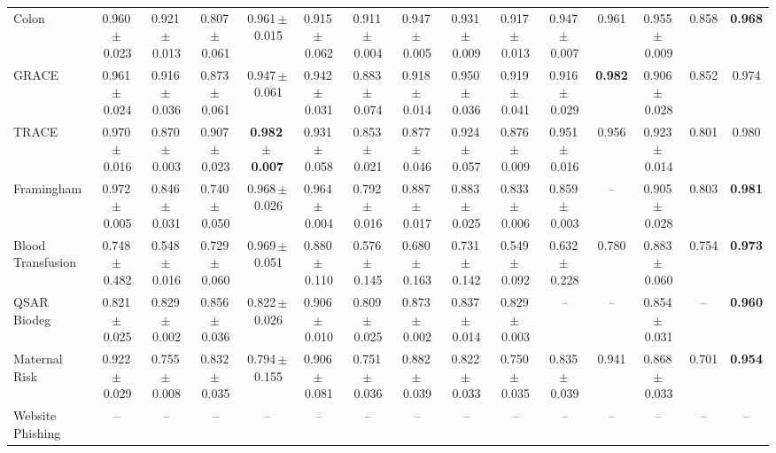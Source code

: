 \documentclass[8pt]{extarticle}
\begin{document}
\begin{longtable}{l*{14}{c}}
Colon & 0.960\,$\pm$\,0.023 & 0.921\,$\pm$\,0.013 & 0.807\,$\pm$\,0.061 & 0.961\,$\pm$\,0.015 & 0.915\,$\pm$\,0.062 & 0.911\,$\pm$\,0.004 & 0.947\,$\pm$\,0.005 & 0.931\,$\pm$\,0.009 & 0.917\,$\pm$\,0.013 & 0.947\,$\pm$\,0.007 & 0.961 & 0.955\,$\pm$\,0.009 & 0.858 & \textbf{0.968} \\
GRACE & 0.961\,$\pm$\,0.024 & 0.916\,$\pm$\,0.036 & 0.873\,$\pm$\,0.061 & 0.947\,$\pm$\,0.061 & 0.942\,$\pm$\,0.031 & 0.883\,$\pm$\,0.074 & 0.918\,$\pm$\,0.014 & 0.950\,$\pm$\,0.036 & 0.919\,$\pm$\,0.041 & 0.916\,$\pm$\,0.029 & \textbf{0.982} & 0.906\,$\pm$\,0.028 & 0.852 & 0.974 \\
TRACE & 0.970\,$\pm$\,0.016 & 0.870\,$\pm$\,0.003 & 0.907\,$\pm$\,0.023 & \textbf{0.982\,$\pm$\,0.007} & 0.931\,$\pm$\,0.058 & 0.853\,$\pm$\,0.021 & 0.877\,$\pm$\,0.046 & 0.924\,$\pm$\,0.057 & 0.876\,$\pm$\,0.009 & 0.951\,$\pm$\,0.016 & 0.956 & 0.923\,$\pm$\,0.014 & 0.801 & 0.980 \\
Framingham & 0.972\,$\pm$\,0.005 & 0.846\,$\pm$\,0.031 & 0.740\,$\pm$\,0.050 & 0.968\,$\pm$\,0.026 & 0.964\,$\pm$\,0.004 & 0.792\,$\pm$\,0.016 & 0.887\,$\pm$\,0.017 & 0.883\,$\pm$\,0.025 & 0.833\,$\pm$\,0.006 & 0.859\,$\pm$\,0.003 & -- & 0.905\,$\pm$\,0.028 & 0.803 & \textbf{0.981} \\
Blood Transfusion & 0.748\,$\pm$\,0.482 & 0.548\,$\pm$\,0.016 & 0.729\,$\pm$\,0.060 & 0.969\,$\pm$\,0.051 & 0.880\,$\pm$\,0.110 & 0.576\,$\pm$\,0.145 & 0.680\,$\pm$\,0.163 & 0.731\,$\pm$\,0.142 & 0.549\,$\pm$\,0.092 & 0.632\,$\pm$\,0.228 & 0.780 & 0.883\,$\pm$\,0.060 & 0.754 & \textbf{0.973} \\
QSAR Biodeg & 0.821\,$\pm$\,0.025 & 0.829\,$\pm$\,0.002 & 0.856\,$\pm$\,0.036 & 0.822\,$\pm$\,0.026 & 0.906\,$\pm$\,0.010 & 0.809\,$\pm$\,0.025 & 0.873\,$\pm$\,0.002 & 0.837\,$\pm$\,0.014 & 0.829\,$\pm$\,0.003 & -- & -- & 0.854\,$\pm$\,0.031 & -- & \textbf{0.960} \\
Maternal Risk & 0.922\,$\pm$\,0.029 & 0.755\,$\pm$\,0.008 & 0.832\,$\pm$\,0.035 & 0.794\,$\pm$\,0.155 & 0.906\,$\pm$\,0.081 & 0.751\,$\pm$\,0.036 & 0.882\,$\pm$\,0.039 & 0.822\,$\pm$\,0.033 & 0.750\,$\pm$\,0.035 & 0.835\,$\pm$\,0.039 & 0.941 & 0.868\,$\pm$\,0.033 & 0.701 & \textbf{0.954} \\
Website Phishing & -- & -- & -- & -- & -- & -- & -- & -- & -- & -- & -- & -- & -- & -- \\
\end{longtable}
\end{document}
